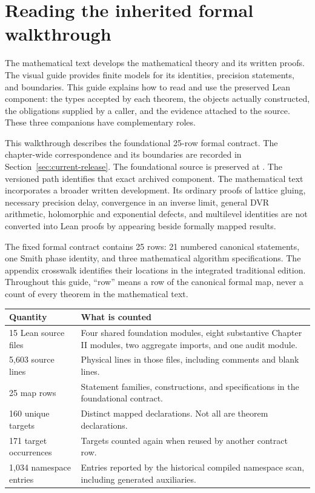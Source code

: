 \section{Reading the inherited formal walkthrough}\label{sec:orientation}

The mathematical text develops the mathematical theory and its written proofs. The visual guide provides finite models for its identities, precision statements, and boundaries. This guide explains how to read and use the preserved Lean component: the types accepted by each theorem, the objects actually constructed, the obligations supplied by a caller, and the evidence attached to the source. These three companions have complementary roles.

This walkthrough describes the foundational 25-row formal contract. The chapter-wide correspondence and its boundaries are recorded in Section~\ref{sec:current-release}. The foundational source is preserved at . The versioned path identifies that exact archived component. The mathematical text incorporates a broader written development. Its ordinary proofs of lattice gluing, necessary precision delay, convergence in an inverse limit, general DVR arithmetic, holomorphic and exponential defects, and multilevel identities are not converted into Lean proofs by appearing beside formally mapped results.

The fixed formal contract contains 25 rows: 21 numbered canonical statements, one Smith phase identity, and three mathematical algorithm specifications. The appendix crosswalk identifies their locations in the integrated traditional edition. Throughout this guide, ``row'' means a row of the canonical formal map, never a count of every theorem in the mathematical text.

\begin{tabular}{p{}p{}}
\toprule Quantity & What is counted \\\midrule
15 Lean source files & Four shared foundation modules, eight substantive Chapter II modules, two aggregate imports, and one audit module. \\
5,603 source lines & Physical lines in those files, including comments and blank lines. \\
25 map rows & Statement families, constructions, and specifications in the foundational contract. \\
160 unique targets & Distinct mapped declarations. Not all are theorem declarations. \\
171 target occurrences & Targets counted again when reused by another contract row. \\
1,034 namespace entries & Entries reported by the historical compiled namespace scan, including generated auxiliaries. \\
\bottomrule
\end{tabular}

